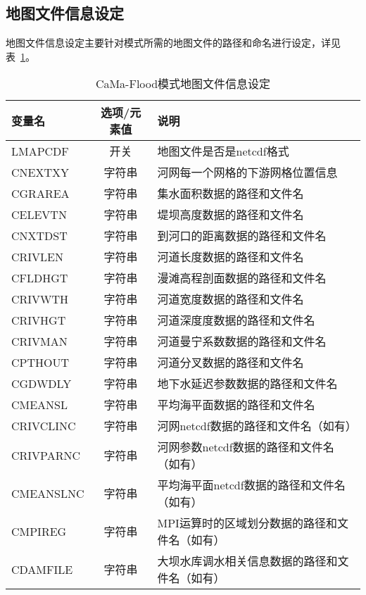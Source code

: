 \subsection{地图文件信息设定}
地图文件信息设定主要针对模式所需的地图文件的路径和命名进行设定，详见表~\ref{CaMa-Flood模式地图文件信息设定}。
\begin{table}[!htbp]
\caption{CaMa-Flood模式地图文件信息设定}
\centering \renewcommand{\arraystretch}{1.5}
\label{CaMa-Flood模式地图文件信息设定}

\begin{tabular}{lcp{}}
\toprule
\textbf{变量名} & \textbf{选项/元素值} & \textbf{说明} \\\midrule
LMAPCDF & 开关 & 地图文件是否是netcdf格式 \\
CNEXTXY & 字符串 & 河网每一个网格的下游网格位置信息 \\
CGRAREA & 字符串 & 集水面积数据的路径和文件名 \\
CELEVTN & 字符串 & 堤坝高度数据的路径和文件名 \\
CNXTDST & 字符串 & 到河口的距离数据的路径和文件名 \\
CRIVLEN & 字符串 & 河道长度数据的路径和文件名 \\
CFLDHGT & 字符串 & 漫滩高程剖面数据的路径和文件名 \\
CRIVWTH & 字符串 & 河道宽度数据的路径和文件名 \\
CRIVHGT & 字符串 & 河道深度度数据的路径和文件名 \\
CRIVMAN & 字符串 & 河道曼宁系数数据的路径和文件名 \\
CPTHOUT & 字符串 & 河道分叉数据的路径和文件名 \\
CGDWDLY & 字符串 & 地下水延迟参数数据的路径和文件名 \\
CMEANSL & 字符串 & 平均海平面数据的路径和文件名 \\
CRIVCLINC & 字符串 & 河网netcdf数据的路径和文件名（如有） \\
CRIVPARNC & 字符串 & 河网参数netcdf数据的路径和文件名（如有） \\
CMEANSLNC & 字符串 & 平均海平面netcdf数据的路径和文件名（如有） \\
CMPIREG & 字符串 & {MPI}运算时的区域划分数据的路径和文件名（如有） \\
CDAMFILE & 字符串 & 大坝水库调水相关信息数据的路径和文件名（如有） \\
\bottomrule
\end{tabular}
\end{table}

